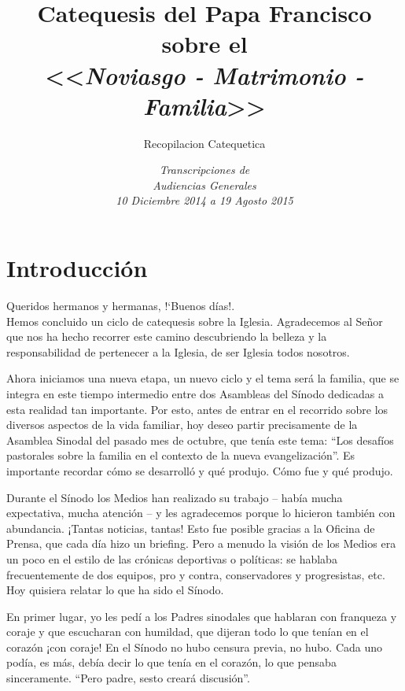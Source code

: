 \documentclass[letterpaper]{report}
\title{Catequesis del Papa Francisco sobre el\\ <<\textit{Noviasgo - Matrimonio - Familia}>>}
\author{Recopilacion Catequetica}
\date{ \textit{Transcripciones de\\ Audiencias Generales\\ 10 Diciembre 2014 a 19 Agosto 2015} }
\begin{document}
	\setcounter{secnumdepth}{0}
	
	\maketitle
	
	\tableofcontents
	
	\section{ Introducci\'on }
		Queridos hermanos y hermanas, !`Buenos d\'ias!.\\
		
		Hemos concluido un ciclo de catequesis sobre la Iglesia. Agradecemos al Se\~nor 
		que nos ha hecho recorrer este camino descubriendo la belleza y la responsabilidad de
		pertenecer a la Iglesia, de ser Iglesia todos nosotros.
		
		Ahora iniciamos una nueva etapa, un nuevo ciclo y el tema ser\'a la familia, que se
		integra en este tiempo intermedio entre dos Asambleas del Sínodo dedicadas a esta
		realidad tan importante. Por esto, antes de entrar en el recorrido sobre los diversos
		aspectos de la vida familiar, hoy deseo partir precisamente de la Asamblea Sinodal
		del pasado mes de octubre, que tenía este tema: “Los desafíos pastorales sobre la
		familia en el contexto de la nueva evangelización”. Es importante recordar cómo se
		desarrolló y qué produjo. Cómo fue y qué produjo.

		Durante el Sínodo los Medios han realizado su trabajo – había mucha expectativa,
		mucha atención – y les agradecemos porque lo hicieron también con abundancia.
		¡Tantas noticias, tantas! Esto fue posible gracias a la Oficina de Prensa, que cada
		día hizo un briefing. Pero a menudo la visión de los Medios era un poco en el estilo
		de las crónicas deportivas o políticas: se hablaba frecuentemente de dos equipos, 
		pro y contra, conservadores y progresistas, etc. Hoy quisiera relatar lo que ha sido
		el Sínodo.
		
		En primer lugar, yo les pedí a los Padres sinodales que hablaran con franqueza y
		coraje y que escucharan con humildad, que dijeran todo lo que tenían en el corazón
		¡con coraje! En el Sínodo no hubo censura previa, no hubo. Cada uno podía, es más,
		debía decir lo que tenía en el corazón, lo que pensaba sinceramente. “Pero padre,
		sesto creará discusión”.
		
\end{document}
